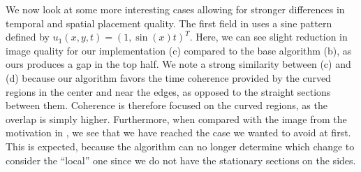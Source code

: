 We now look at some more interesting cases allowing for stronger differences in temporal and spatial placement quality.
The first field in  uses a sine pattern defined by $u_1(x,y,t)=(1, \sin(x)t)^T$.
Here, we can see slight reduction in image quality for our implementation (c) compared to the base algorithm (b), as ours
produces a gap in the top half.
We note a strong similarity between (c) and (d) because
our algorithm favors the time coherence provided by the curved regions in the center and near the edges,
as opposed to the straight sections between them.
Coherence is therefore focused on the curved regions, as the overlap is simply higher.
Furthermore, when compared with the image from the motivation in ,
we see that we have reached the case we wanted to avoid at first.
This is expected, because the algorithm can no longer determine
which change to consider the ``local'' one since we do not have the stationary sections on the sides.

\newpage

